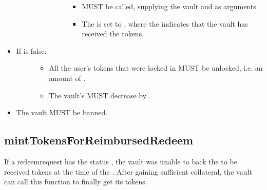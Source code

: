 \documentclass[a4paper,10pt,english]{sphinxmanual}
\begin{document}
\begin{itemize}
\begin{description}
\begin{itemize}
\begin{description}
\begin{itemize}
\item {} 
{\hyperref[\detokenize{spec/vault-registry:decreasetoberedeemedtokens}]{}} MUST be called, supplying the vault and  as arguments.

\item {} 
The  is set to , where the  indicates that the vault has received the tokens.

\end{itemize}

\end{description}

\end{itemize}

\end{description}

\item {} \begin{description}
\item[{If  is false:}] \leavevmode\begin{itemize}
\item {} 
All the user’s tokens that were locked in {\hyperref[\detokenize{spec/redeem:requestredeem}]{}} MUST be unlocked, i.e. an amount of .

\item {} 
The vault’s  MUST decrease by .

\end{itemize}

\end{description}

\item {} 
The vault MUST be banned.

\end{itemize}


\subsection{mintTokensForReimbursedRedeem}
\label{\detokenize{spec/redeem:minttokensforreimbursedredeem}}\label{\detokenize{spec/redeem:id12}}
If a redeemrequest has the status , the vault was unable to back the to be received tokens at the time of the . After gaining sufficient collateral, the vault can call this function to finally get its tokens.
\end{document}
